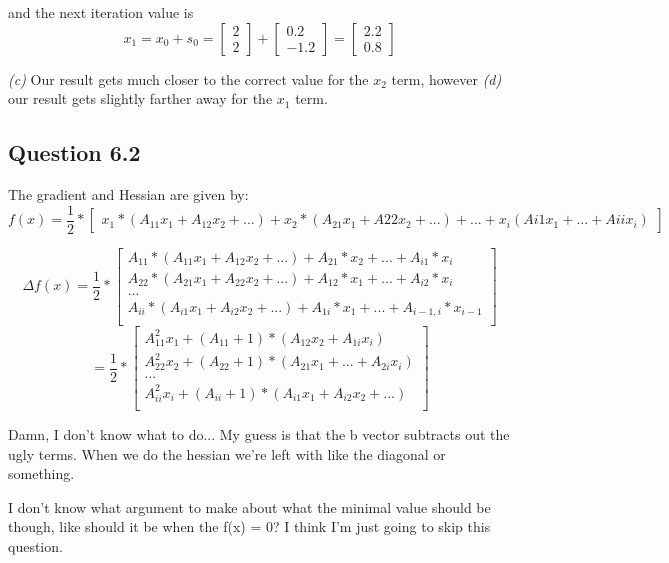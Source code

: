 \documentclass[12pt,a4paper]{report}
\begin{document}
and the next iteration value is $$x_1 = x_0 + s_0 =
\left[ \begin{smallmatrix} 2 \\ 2 \end{smallmatrix}\right] + 
\left[ \begin{smallmatrix} 0.2 \\ -1.2 \end{smallmatrix}\right]=
\left[ \begin{smallmatrix} 2.2 \\ 0.8 \end{smallmatrix}\right]$$

\textit{(c)} Our result gets much closer to the correct value for the $x_2$ term,
however \textit{(d)} our result gets slightly farther away for the $x_1$ term.

\subsection*{Question 6.2}
The gradient and Hessian are given by:
$$f(x)= \frac{1}{2} * \left[ \begin{smallmatrix}  x_1 * (A_{11}x_1 + A_{12} x_2 + ...) + x_2 * (A_{21} x_1 + A{22} x_2 + ...) + ... + x_i (A{i1} x_1 + ... + A{ii} x_i)
 \end{smallmatrix} \right]$$

$$\Delta f(x)= \frac{1}{2} * \left[ \begin{smallmatrix} A_{11} * (A_{11}x_1 + A_{12} x_2 + ...)
+ A_{21} * x_2 + ... + A_{i1} * x_i\\
A_{22} * (A_{21}x_1 + A_{22} x_2 + ...) + A_{12} * x_1 + ... + A_{i2} * x_i\\
...\\
A_{ii} * (A_{i1}x_1 + A_{i2} x_2 + ...) + A_{1i} * x_1 + ... + A_{i-1, i} * x_{i-1}\\
 \end{smallmatrix} \right]$$
$$=\frac{1}{2} * \left[ \begin{smallmatrix} 
A_{11}^2 x_1 + (A_{11} + 1) * (A_{12} x_2 + A_{1i}  x_i)\\
A_{22}^2 x_2 + (A_{22} + 1) * (A_{21}x_1 + ... + A_{2i}  x_i)\\
...\\
A_{ii}^2 x_i + (A_{ii} + 1) * (A_{i1}x_1 + A_{i2} x_2 + ...)\\
 \end{smallmatrix} \right]$$

{\color{red} Damn, I don't know what to do...
My guess is that the b vector subtracts out the ugly terms.
When we do the hessian we're left with like the diagonal or something.

I don't know what argument to make about what the minimal value should be though,
like should it be when the f(x) = 0? I think I'm just going to skip this question.
}
\end{document}

